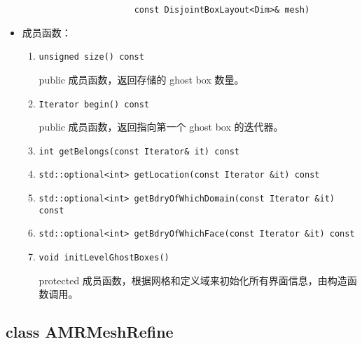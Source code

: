\documentclass[cn, bibend=bibtex]{elegantpaper}
\theoremstyle{plain}
\begin{document}
\begin{itemize}
\begin{enumerate}
          \lstinline|                   const DisjointBoxLayout<Dim>& mesh)|
  \end{enumerate}
  \item 成员函数：
  \begin{enumerate}
    \item \lstinline|unsigned size() const|

    public 成员函数，返回存储的 ghost box 数量。

    \item \lstinline|Iterator begin() const|

    public 成员函数，返回指向第一个 ghost box 的迭代器。

    \item \lstinline|int getBelongs(const Iterator& it) const|

    \item \lstinline|std::optional<int> getLocation(const Iterator &it) const|

    \item \lstinline|std::optional<int> getBdryOfWhichDomain(const Iterator &it) const|

    \item \lstinline|std::optional<int> getBdryOfWhichFace(const Iterator &it) const|

    \item \lstinline|void initLevelGhostBoxes()|

    protected 成员函数，根据网格和定义域来初始化所有界面信息，由构造函数调用。
  \end{enumerate}
\end{itemize}


\subsection{class AMRMeshRefine}
\end{document}
